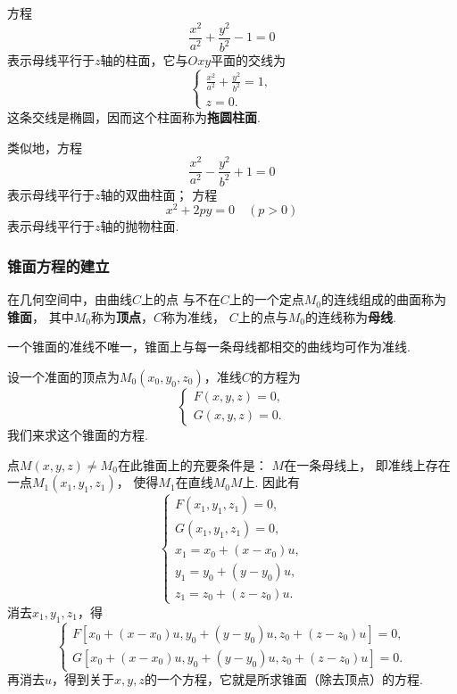 \begin{example}
方程\[
	\frac{x^2}{a^2} + \frac{y^2}{b^2} - 1 = 0
\]
表示母线平行于\(z\)轴的柱面，它与\(Oxy\)平面的交线为\[
	\left\{ \begin{array}{l}
		\frac{x^2}{a^2} + \frac{y^2}{b^2} = 1, \\
		z = 0.
	\end{array} \right.
\]
这条交线是椭圆，因而这个柱面称为\textbf{拖圆柱面}.

类似地，方程\[
	\frac{x^2}{a^2} - \frac{y^2}{b^2} + 1 = 0
\]
表示母线平行于\(z\)轴的双曲柱面；
方程\[
	x^2 + 2py = 0
	\quad(p>0)
\]
表示母线平行于\(z\)轴的抛物柱面.
\end{example}

\subsubsection{锥面方程的建立}
在几何空间中，由曲线\(C\)上的点
与不在\(C\)上的一个定点\(M_0\)的连线组成的曲面称为\textbf{锥面}，
其中\(M_0\)称为\textbf{顶点}，\(C\)称为准线，
\(C\)上的点与\(M_0\)的连线称为\textbf{母线}.

一个锥面的准线不唯一，锥面上与每一条母线都相交的曲线均可作为准线.

设一个准面的顶点为\(M_0(x_0,y_0,z_0)\)，准线\(C\)的方程为\[
	\left\{ \begin{array}{l}
		F(x,y,z) = 0, \\
		G(x,y,z) = 0.
	\end{array} \right.
\]
我们来求这个锥面的方程.

点\(M(x,y,z)\neq M_0\)在此锥面上的充要条件是：
\(M\)在一条母线上，
即准线上存在一点\(M_1(x_1,y_1,z_1)\)，
使得\(M_1\)在直线\(M_0 M\)上.
因此有\[
	\left\{ \begin{array}{l}
		F(x_1,y_1,z_1) = 0, \\
		G(x_1,y_1,z_1) = 0, \\
		x_1 = x_0 + (x - x_0) u, \\
		y_1 = y_0 + (y - y_0) u, \\
		z_1 = z_0 + (z - z_0) u.
	\end{array} \right.
\]
消去\(x_1,y_1,z_1\)，得\[
	\left\{ \begin{array}{l}
		F[x_0 + (x-x_0) u,y_0 + (y-y_0) u, z_0 + (z - z_0) u] = 0, \\
		G[x_0 + (x-x_0) u,y_0 + (y-y_0) u, z_0 + (z - z_0) u] = 0.
	\end{array} \right.
\]
再消去\(u\)，得到关于\(x,y,z\)的一个方程，它就是所求锥面（除去顶点）的方程.

